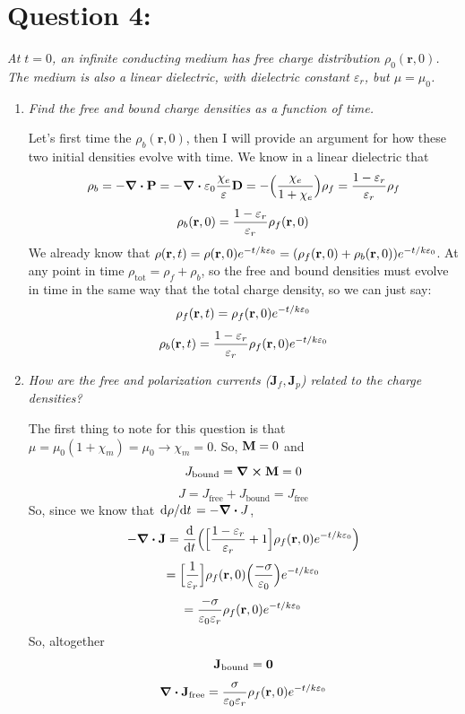 \documentclass[12pt]{article}
\begin{document}

\section*{Question 4:}
\emph{At $t=0$, an infinite conducting medium has free charge distribution $\rho_0(\textbf{r},0)$. The medium is also a linear dielectric, with dielectric constant $\varepsilon_r$, but $\mu = \mu_0$.}
\begin{enumerate}[label=\alph*)]
\item \emph{Find the free and bound charge densities as a function of time.}\bigskip

\par Let's first time the $\rho_b(\textbf{r},0)$, then I will provide an argument for how these two initial densities evolve with time. We know in a linear dielectric that
\[\rho_b = -\div{\vb{P}}= -\div{\varepsilon_0\frac{\chi_e}{\varepsilon}\vb{D}} = -\Big(\frac{\chi_e}{1+\chi_e}\Big)\rho_f = \frac{1-\varepsilon_r}{\varepsilon_r}\rho_f\]
\[\rho_b(\vb{r},0) = \frac{1-\varepsilon_r}{\varepsilon_r}\rho_f(\vb{r},0)\]
We already know that $\rho(\vb{r},t)=\rho(\vb{r},0)e^{-t/k\varepsilon_0}= (\rho_f(\vb{r},0)+\rho_b(\vb{r},0))e^{-t/k\varepsilon_0}$. At any point in time $\rho_{\text{tot}} = \rho_f+\rho_b$, so the free and bound densities must evolve in time in the same way that the total charge density, so we can just say:
\[\rho_f(\vb{r},t) = \rho_f(\vb{r},0)e^{-t/k\varepsilon_0}\]
\[\rho_b(\vb{r},t) = \frac{1-\varepsilon_r}{\varepsilon_r}\rho_f(\vb{r},0)e^{-t/k\varepsilon_0}\]

\item \emph{How are the free and polarization currents ($\textbf{J}_f, \textbf{J}_p$) related to the charge densities?}\bigskip

The first thing to note for this question is that $\mu = \mu_0(1+\chi_m) = \mu_0 \rightarrow \chi_m = 0$. So, $\vb{M} = 0$ and 
\[J_{\text{bound}} = \curl{\vb{M}} = 0\]
\[J = J_{\text{free}} + J_{\text{bound}} = J_{\text{free}}\]
So, since we know that $\dv*{\rho}{t} = -\div{J}$, 
\[-\div{\vb{J}} = \dv{t}\Big(\Big[\frac{1-\varepsilon_r}{\varepsilon_r} + 1\Big]\rho_f(\vb{r},0)e^{-t/k\varepsilon_0}\Big)\]
\[ = \Big[\frac{1}{\varepsilon_r}\Big]\rho_f(\vb{r},0)\Big(\frac{-\sigma}{\varepsilon_0}\Big)e^{-t/k\varepsilon_0}\]
\[ = \frac{-\sigma}{\varepsilon_0 \varepsilon_r}\rho_f(\vb{r},0)e^{-t/k\varepsilon_0}\]
So, altogether
\[\vb{J_\text{bound} = 0}\] 
\begin{equation}
\div{\vb{J}_\text{free}} = \frac{\sigma}{\varepsilon_0 \varepsilon_r}\rho_f(\vb{r},0)e^{-t/k\varepsilon_0}
\label{eq:4.b}
\end{equation}


\end{enumerate}
\end{document}
